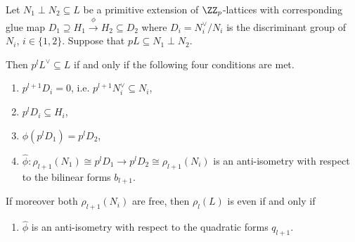 \begin{proposition}\label{glue:estimate-level}
 Let $N_1 \perp N_2 \subseteq L$ be a primitive extension of $\ZZ_p$-lattices with corresponding glue map
 $D_1 \supseteq H_1 \xrightarrow{\phi} H_2 \subseteq D_2$ where $D_i=N_i^\vee/N_i$ is the discriminant group of $N_i$, $i\in \{1,2\}$. Suppose that $p L \subseteq N_1 \perp N_2$.

 Then $p^l L^\vee \subseteq L$ if and only if the following four conditions are met.
 \begin{enumerate}
  \item $p^{l+1} D_i = 0$, i.e. $p^{l+1}N_i^\vee\subseteq N_i$,
  \item $p^l D_i \subseteq H_i$,
  \item $\phi(p^l D_1) = p^l D_2$,
  \item $\hat \phi \colon \rho_{l+1}(N_1)\cong p^lD_1 \to p^lD_2 \cong \rho_{l+1}(N_i)$ is an anti-isometry with respect to the bilinear forms $b_{l+1}$.
 \end{enumerate}
If moreover both $\rho_{l+1}(N_i)$ are free, then $\rho_l(L)$ is even if and only if
 \begin{enumerate}
\item [(4')] $\hat\phi$ is an anti-isometry with respect to the quadratic forms $q_{l+1}$.
 \end{enumerate}
\end{proposition}

